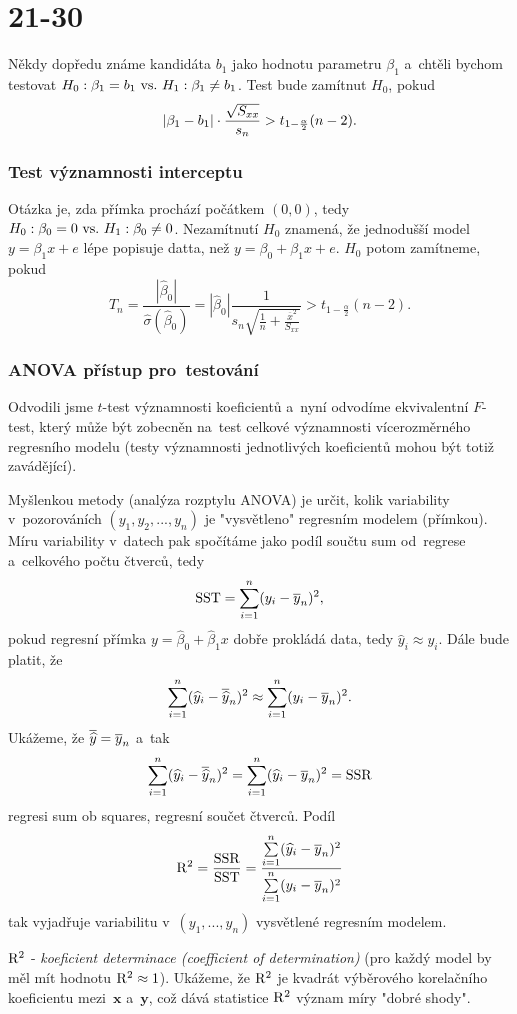 \chapter{21-30}
\begin{remark}
	Někdy dopředu známe kandidáta $b_1$ jako hodnotu parametru $\beta_1$ a~chtěli bychom testovat 
	$H_0: \beta_1=b_1 ~\text{vs.}~ H_1: \beta_1\neq b_1$. Test bude zamítnut $H_0$, pokud 
	$$ \left|\beta_1-b_1\right|\cdot \frac{\sqrt{S_{xx}}}{s_n}> t_{1-\frac{\alpha}{2}}(n-2). $$
\end{remark}
\subsection{Test významnosti interceptu}
Otázka je, zda přímka prochází počátkem $(0,0)$, tedy $H_0: \beta_0=0 ~\text{vs.}~ H_1: \beta_0\neq0$. Nezamítnutí $H_0$ znamená, že jednodušší model $y=\beta_1 x+e$ lépe popisuje datta, než $y=\beta_0+\beta_1 x+e$. $H_0$ potom zamítneme, pokud
$$ T_n=\frac{|\widehat{\beta}_0|}{\widehat{\sigma}(\widehat{\beta}_0)}=|\widehat{\beta}_0|\frac{1}{s_n\sqrt{\frac{1}{n}+\frac{\overline{x}^2}{S_{xx}}}}>t_{1-\frac{\alpha}{2}}(n-2). $$

\subsection{ANOVA přístup pro~testování}
Odvodili jsme $t$-test významnosti koeficientů a~nyní odvodíme ekvivalentní $F$-test, který může být zobecněn na~test celkové významnosti vícerozměrného regresního modelu (testy významnosti jednotlivých koeficientů mohou být totiž zavádějící). 

Myšlenkou metody (analýza rozptylu ANOVA) je určit, kolik variability v~pozorováních $(y_1,y_2,...,y_n)$ je "vysvětleno" regresním modelem (přímkou). Míru variability v~datech pak spočítáme jako podíl součtu sum od~regrese a~celkového počtu čtverců, tedy
$$ \mathrm{SST}=\sum_{i=1}^{n}(y_i-\overline{y}_n)^2, $$
pokud regresní přímka $y=\widehat{\beta}_0+\widehat{\beta}_1 x$ dobře prokládá data, tedy $\widehat{y}_i\approx y_i$. Dále bude platit, že 
$$ \sum\limits_{i=1}^{n} (\widehat{y}_i-\overline{\widehat{y}}_n)^2\approx\sum\limits_{i=1}^{n} (y_i-\overline{y}_n)^2. $$
Ukážeme, že $\overline{\widehat{y}}=\overline{y}_n$ a~tak 
$$ \sum\limits_{i=1}^{n}(\widehat{y}_i-\overline{\widehat{y}}_n)^2=\sum\limits_{i=1}^{n} (\widehat{y}_i-\overline{y}_n)^2=\mathrm{SSR} $$ regresi sum ob squares, regresní součet čtverců. Podíl
$$ \mathrm{R}^2=\frac{\mathrm{SSR}}{\mathrm{SST}}=\frac{\sum\limits_{i=1}^{n} (\widehat{y}_i-\overline{y}_n)^2}{\sum\limits_{i=1}^{n} (y_i-\overline{y}_n)^2}$$ tak vyjadřuje variabilitu v~$(y_1,...,y_n)$ vysvětlené regresním modelem. 

$\mathrm{R}^2$ - \textit{koeficient determinace (coefficient of determination)} (pro každý model by měl mít hodnotu $\mathrm{R}^2\approx 1$). Ukážeme, že $\mathrm{R}^2$ je kvadrát výběrového korelačního koeficientu mezi~$\textbf{x}$ a~$\textbf{y}$, což dává statistice $\mathrm{R}^2$ význam míry "dobré shody". 

